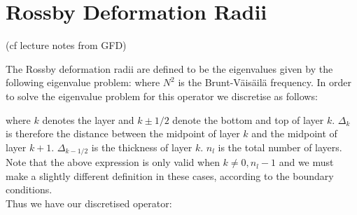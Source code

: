 \documentclass[10pt]{article}
\begin{document}
\section{Rossby Deformation Radii}

(cf lecture notes from GFD)

The Rossby deformation radii are defined to be the eigenvalues given by the following eigenvalue problem:
where $N^{2}$ is the Brunt-V\"{a}is\"{a}il\"{a} frequency. In order to solve the eigenvalue problem for this operator we discretise as follows:

where $k$ denotes the layer and $k\pm1/2$ denote the bottom and top of layer $k$. $\Delta_{k}$ is therefore the distance between the midpoint of layer $k$ and the midpoint of layer $k+1$. $\Delta_{k-1/2}$ is the thickness of layer $k$. $n_{l}$ is the total number of layers. Note that the above expression is only valid when $k\neq 0, n_{l}-1$ and we must make a slightly different definition in these cases, according to the boundary conditions.  \\
\linebreak
Thus we have our discretised operator:
\end{document}
